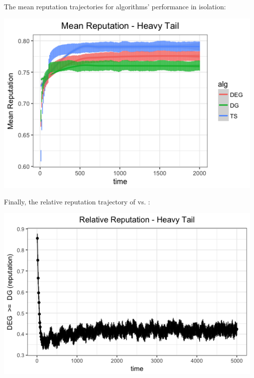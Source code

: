 \documentclass[../competing_bandits_with_appendix.tex]{subfiles}
\begin{document}
The mean reputation trajectories for algorithms' performance in isolation:
\begin{center}
\includegraphics[scale=0.35]{ec19paper/appendix_figures/mean_ht_3_arms} \\
\end{center}

Finally, the relative reputation trajectory of \DEG vs. \DG:
\begin{center}
\includegraphics[scale=0.35]{ec19paper/appendix_figures/rel_rep_ht_3_arms}
\end{center}
\end{document}
